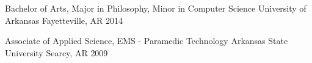 

\begin{cventries}

  \cventry
  {Bachelor of Arts, Major in Philosophy, Minor in Computer Science} %
    {University of Arkansas} %
    {Fayetteville, AR} %
    {2014} %
        {
      \begin{cvitems} %
       {}
      \end{cvitems}
    }
    
  \cventry
  {Associate of Applied Science, EMS - Paramedic Technology} %
    {Arkansas State University} %
    {Searcy, AR} %
    {2009} %
    {
      \begin{cvitems} %
       {}
      \end{cvitems}
    }

\end{cventries}
